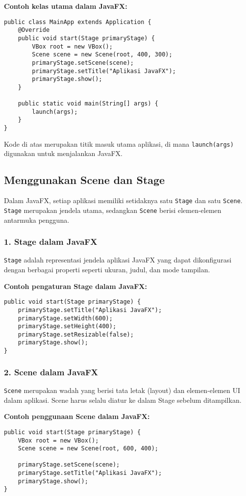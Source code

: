 \textbf{Contoh kelas utama dalam JavaFX:}
\begin{lstlisting}[style=JavaStyle, caption=Kelas utama JavaFX]
public class MainApp extends Application {
	@Override
	public void start(Stage primaryStage) {
		VBox root = new VBox();
		Scene scene = new Scene(root, 400, 300);
		primaryStage.setScene(scene);
		primaryStage.setTitle("Aplikasi JavaFX");
		primaryStage.show();
	}
	
	public static void main(String[] args) {
		launch(args);
	}
}
\end{lstlisting}

Kode di atas merupakan titik masuk utama aplikasi, di mana \texttt{launch(args)} digunakan untuk menjalankan JavaFX.

\subsection{Menggunakan Scene dan Stage}

Dalam JavaFX, setiap aplikasi memiliki setidaknya satu \texttt{Stage} dan satu \texttt{Scene}. \texttt{Stage} merupakan jendela utama, sedangkan \texttt{Scene} berisi elemen-elemen antarmuka pengguna.

\subsubsection{1. Stage dalam JavaFX}
\texttt{Stage} adalah representasi jendela aplikasi JavaFX yang dapat dikonfigurasi dengan berbagai properti seperti ukuran, judul, dan mode tampilan.

\textbf{Contoh pengaturan Stage dalam JavaFX:}
\begin{lstlisting}[style=JavaStyle, caption=Mengatur Stage dalam JavaFX]
public void start(Stage primaryStage) {
	primaryStage.setTitle("Aplikasi JavaFX");
	primaryStage.setWidth(600);
	primaryStage.setHeight(400);
	primaryStage.setResizable(false);
	primaryStage.show();
}
\end{lstlisting}


\subsubsection{2. Scene dalam JavaFX}
\texttt{Scene} merupakan wadah yang berisi tata letak (layout) dan elemen-elemen UI dalam aplikasi. Scene harus selalu diatur ke dalam Stage sebelum ditampilkan.

\textbf{Contoh penggunaan Scene dalam JavaFX:}
\begin{lstlisting}[style=JavaStyle, caption=Membuat Scene dengan layout VBox]
public void start(Stage primaryStage) {
	VBox root = new VBox();
	Scene scene = new Scene(root, 600, 400);
	
	primaryStage.setScene(scene);
	primaryStage.setTitle("Aplikasi JavaFX");
	primaryStage.show();
}
\end{lstlisting}


